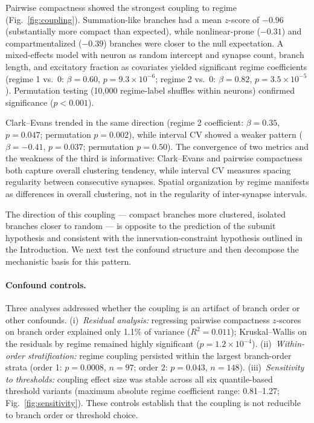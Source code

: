\documentclass[11pt]{article}
\begin{document}
Pairwise compactness showed the strongest coupling to regime (Fig.~\ref{fig:coupling}). Summation-like branches had a mean $z$-score of $-0.96$ (substantially more compact than expected), while nonlinear-prone ($-0.31$) and compartmentalized ($-0.39$) branches were closer to the null expectation. A mixed-effects model with neuron as random intercept and synapse count, branch length, and excitatory fraction as covariates yielded significant regime coefficients (regime 1 vs.\ 0: $\beta = 0.60$, $p = 9.3 \times 10^{-6}$; regime 2 vs.\ 0: $\beta = 0.82$, $p = 3.5 \times 10^{-5}$). Permutation testing (10,000 regime-label shuffles within neurons) confirmed significance ($p < 0.001$).

Clark--Evans trended in the same direction (regime 2 coefficient: $\beta = 0.35$, $p = 0.047$; permutation $p = 0.002$), while interval CV showed a weaker pattern ($\beta = -0.41$, $p = 0.037$; permutation $p = 0.50$). The convergence of two metrics and the weakness of the third is informative: Clark--Evans and pairwise compactness both capture overall clustering tendency, while interval CV measures spacing regularity between consecutive synapses. Spatial organization by regime manifests as differences in overall clustering, not in the regularity of inter-synapse intervals.

The direction of this coupling --- compact branches more clustered, isolated branches closer to random --- is opposite to the prediction of the subunit hypothesis and consistent with the innervation-constraint hypothesis outlined in the Introduction. We next test the confound structure and then decompose the mechanistic basis for this pattern.

\paragraph{Confound controls.}
Three analyses addressed whether the coupling is an artifact of branch order or other confounds. (i)~\textit{Residual analysis:} regressing pairwise compactness $z$-scores on branch order explained only 1.1\% of variance ($R^2 = 0.011$); Kruskal--Wallis on the residuals by regime remained highly significant ($p = 1.2 \times 10^{-4}$). (ii)~\textit{Within-order stratification:} regime coupling persisted within the largest branch-order strata (order 1: $p = 0.0008$, $n = 97$; order 2: $p = 0.043$, $n = 148$). (iii)~\textit{Sensitivity to thresholds:} coupling effect size was stable across all six quantile-based threshold variants (maximum absolute regime coefficient range: 0.81--1.27; Fig.~\ref{fig:sensitivity}). These controls establish that the coupling is not reducible to branch order or threshold choice.
\end{document}
